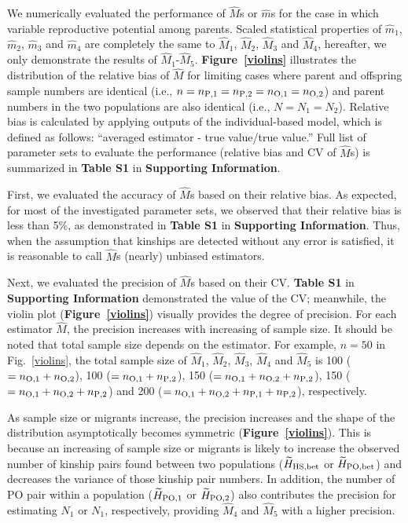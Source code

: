 \documentclass[12pt, English]{article}
\begin{document}
\begin{spacing}{1.9}
We numerically evaluated the performance of ${\hat M}$s or ${\hat m}$s for the case in which variable reproductive potential among parents. Scaled statistical properties of ${\hat m_1}$,  ${\hat m_2}$,  ${\hat m_3}$ and ${\hat m_4}$ are completely the same to ${\hat M_1}$, ${\hat M_2}$, ${\hat M_3}$ and ${\hat M_4}$, hereafter, we only demonstrate the results of ${\hat M_1}$-${\hat M_5}$. {\bf Figure~\ref{violins}} illustrates the distribution of the relative bias of ${\hat M}$ for limiting cases where parent and offspring sample numbers are identical (i.e., $n=n_{\rm P,1}=n_{\rm P,2}=n_{\rm O,1}= n_{\rm O,2}$) and parent numbers in the two populations are also identical (i.e., $N=N_1=N_2$). Relative bias is calculated by applying outputs of the individual-based model, which is defined as follows: ``averaged estimator - true value/true value.'' Full list of parameter sets to evaluate the performance (relative bias and CV of ${\hat M}$s) is summarized in {\bf Table S1} in {\bf Supporting Information}. 
 
\begin{center}
\end{center}

First, we evaluated the accuracy of ${\hat M}$s based on their relative bias. As expected, for most of the investigated parameter sets, we observed that their relative bias is less than 5\%, as demonstrated in {\bf Table S1} in {\bf Supporting Information}. Thus, when the assumption that kinships are detected without any error is satisfied, it is reasonable to call ${\hat M}$s (nearly) unbiased estimators. 

Next, we evaluated the precision of ${\hat M}$s based on their CV. {\bf Table S1} in {\bf Supporting Information} demonstrated the value of the CV; meanwhile, the violin plot ({\bf Figure~\ref{violins}}) visually provides the degree of precision. For each estimator ${\hat M}$, the precision increases with increasing of sample size. It should be noted that total sample size depends on the estimator. For example, $n=50$ in Fig.~\ref{violins}, the total sample size of ${\hat M_1}$, ${\hat M_2}$, ${\hat M_3}$, ${\hat M_4}$ and ${\hat M_5}$ is 100 ($=n_{\rm O,1}+n_{\rm O,2}$), 100 ($=n_{\rm O,1}+n_{\rm P,2}$), 150 ($=n_{\rm O,1}+n_{\rm O,2}+n_{\rm P,2}$), 150 ($=n_{\rm O,1}+n_{\rm O,2}+n_{\rm P,2}$) and 200 ($=n_{\rm O,1}+n_{\rm O,2}+n_{\rm P,1}+n_{\rm P,2}$), respectively. 

As sample size or migrants increase, the precision increases and the shape of the distribution asymptotically becomes symmetric ({\bf Figure~\ref{violins}}). This is because an increasing of sample size or migrants is likely to increase the observed number of kinship pairs found between two populations ($\widetilde{H}_{\rm HS,bet}$ or $\widetilde{H}_{\rm PO,bet}$) and decreases the variance of those kinship pair numbers. In addition, the number of PO pair within a population ($\widetilde{H}_{\rm PO,1}$ or $\widetilde{H}_{\rm PO,2}$) also contributes the precision for estimating $N_1$ or $N_1$, respectively, providing ${\hat M_4}$ and ${\hat M_5}$ with a higher precision. 


\end{spacing}
\end{document}
